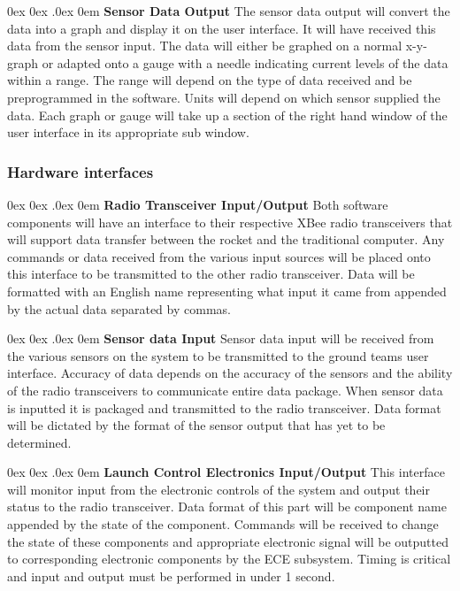 \documentclass[10pt,draftclsnofoot,onecolumn,compsoc]{IEEEtran}
\makeatletter
\renewcommand\paragraph{\@startsection{paragraph}{4}{\z@}%
                                    {0ex \@plus0ex \@minus.0ex}%
                                    {0em}%
                                    {\normalfont\normalsize\bfseries}}
\makeatother
\begin{document}
\paragraph{\bf Sensor Data Output}
The sensor data output will convert the data into a graph and display it on the user interface. It will have received this data from the sensor input. The data will either be graphed on a normal x-y-graph or adapted onto a gauge with a needle indicating current levels of the data within a range. The range will depend on the type of data received and be preprogrammed in the software. Units will depend on which sensor supplied the data. Each graph or gauge will take up a section of the right hand window of the user interface in its appropriate sub window. 


\subsubsection{Hardware interfaces }
\paragraph{\bf Radio Transceiver Input/Output}
		Both software components will have an interface to their respective XBee radio transceivers that will support data transfer between the rocket and the traditional computer. Any commands or data received from the various input sources will be placed onto this interface to be transmitted to the other radio transceiver. Data will be formatted with an English name representing what input it came from appended by the actual data separated by commas.

\paragraph{\bf Sensor data Input}
Sensor data input will be received from the various sensors on the system to be transmitted to the ground teams user interface. Accuracy of data depends on the accuracy of the sensors and the ability of the radio transceivers to communicate entire data package. When sensor data is inputted it is packaged and transmitted to the radio transceiver. Data format will be dictated by the format of the sensor output that has yet to be determined.

\paragraph{\bf Launch Control Electronics Input/Output}
This interface will monitor input from the electronic controls of the system and output their status to the radio transceiver. Data format of this part will be component name appended by the state of the component. Commands will be received to change the state of these components and appropriate electronic signal will be outputted to corresponding electronic components by the ECE subsystem. Timing is critical and input and output must be performed in under 1 second.
\end{document}
